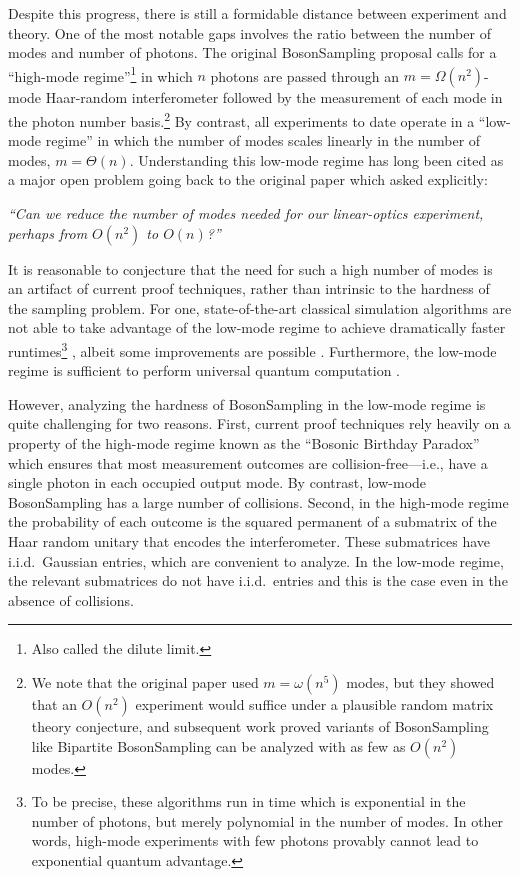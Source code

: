 \documentclass[11pt]{article}
\theoremstyle{plain}
\theoremstyle{plain}
\theoremstyle{plain}
\theoremstyle{plain}
\theoremstyle{plain}
\theoremstyle{plain}
\theoremstyle{plain}
\theoremstyle{remark}
\theoremstyle{remark}
\theoremstyle{plain}
\theoremstyle{plain}
\theoremstyle{plain}
\theoremstyle{plain}
\begin{document}
Despite this progress, there is still a formidable distance between experiment and theory. One of the most notable gaps involves the ratio between the number of modes and number of photons.  The original BosonSampling proposal calls for a ``high-mode regime''\footnote{Also called the dilute limit.} in which $n$ photons are passed through an $m=\Omega(n^2)$-mode Haar-random interferometer followed by the measurement of each mode in the photon number basis.\footnote{We note that the original paper used $m=\omega(n^5)$ modes, but they showed that an $O(n^2)$ experiment would suffice under a plausible random matrix theory conjecture, and subsequent work proved variants of BosonSampling like Bipartite BosonSampling \cite{grier_brod_2021} can be analyzed with as few as $O(n^2)$ modes. } By contrast, all experiments to date operate in a ``low-mode regime'' in which the number of modes scales linearly in the number of modes, $m=\Theta(n)$. Understanding this low-mode regime  has long been cited as a major open problem going back to the original paper \cite{Aaronson2013} which asked explicitly:
\begin{center}
\begin{minipage}{.8\linewidth}
\begin{center}
\textit{``Can we reduce the number of modes needed for our linear-optics experiment, perhaps from $O(n^2)$ to $O(n)$?''}
\end{center}
\end{minipage}
\end{center}
It is reasonable to conjecture that the need for such a high number of modes is an artifact of current proof techniques, rather than intrinsic to the hardness of the sampling problem.  For one, state-of-the-art classical simulation algorithms are not able to take advantage of the low-mode regime to achieve dramatically faster runtimes\footnote{To be precise, these algorithms run in time which is exponential in the number of photons, but merely polynomial in the number of modes. In other words, high-mode experiments with few photons provably cannot lead to exponential quantum advantage.} \cite{clifford2018classical}, albeit some improvements are possible \cite{clifford2020faster,newmichalpaper}.  Furthermore, 
the low-mode regime is sufficient to perform universal quantum computation \cite{knill2001scheme}.

However, analyzing the hardness of BosonSampling in the low-mode regime is quite challenging for two reasons.  First, current proof techniques rely heavily on a property of the high-mode regime known as the ``Bosonic Birthday Paradox'' \cite{arkhipov_kuperberg} which ensures that most measurement outcomes are collision-free---i.e., have a single photon in each occupied output mode.  By contrast, low-mode BosonSampling has a large number of collisions.  Second, in the high-mode regime the probability of each outcome is the squared permanent of a submatrix of the Haar random unitary that encodes the interferometer.  These submatrices have i.i.d.\  Gaussian entries, which are convenient to analyze.  In the low-mode regime, the relevant submatrices do not have i.i.d.\  entries and this is the case even in the absence of collisions.
\end{document}
